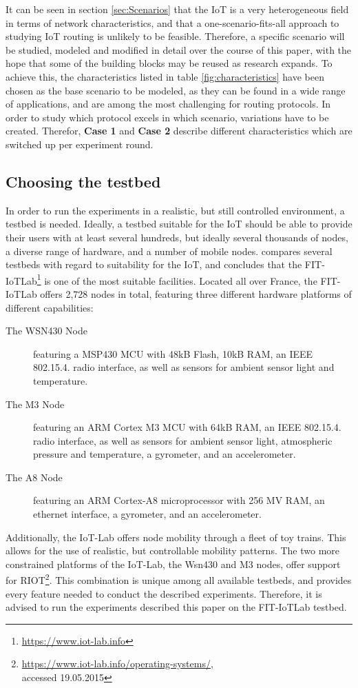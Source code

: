 \documentclass{acm_proc_article-sp}
\begin{document}
It can be seen in section \ref{sec:Scenarios} that the IoT is a very heterogeneous field in terms of network characteristics, and that a one-scenario-fits-all approach to studying IoT routing is unlikely to be feasible. Therefore, a specific scenario will be studied, modeled and modified in detail over the course of this paper, with the hope that some of the building blocks may be reused as research expands. To achieve this, the characteristics listed in table \ref{fig:characteristics} have been chosen as the base scenario to be modeled, as they can be found in a wide range of applications, and are among the most challenging for routing protocols.
In order to study which protocol excels in which scenario, variations have to be created. Therefor, \textbf{Case 1} and \textbf{Case 2} describe different characteristics which are switched up per experiment round.

\subsection{Choosing the testbed}
\label{subsec:testbed_choice}
In order to run the experiments in a realistic, but still controlled environment, a testbed is needed. Ideally, a testbed suitable for the IoT should be able to provide their users with at least several hundreds, but ideally several thousands of nodes, a diverse range of hardware, and a number of mobile nodes. \cite{testbed-survey} compares several testbeds with regard to suitability for the IoT, and concludes that the FIT-IoTLab\footnote{ \url{https://www.iot-lab.info}} is one of the most suitable facilities. Located all over France, the FIT-IoTLab offers 2,728 nodes in total, featuring three different hardware platforms of different capabilities:
\begin{description}
\item[The WSN430 Node] featuring a MSP430 MCU with 48kB Flash, 10kB RAM, an IEEE 802.15.4. radio interface, as well as sensors for ambient sensor light and temperature.
\item[The M3 Node] featuring an ARM Cortex M3 MCU with 64kB RAM, an IEEE 802.15.4. radio interface, as well as sensors for ambient sensor light, atmospheric pressure and temperature, a gyrometer, and an accelerometer.
\item[The A8 Node] featuring an ARM Cortex-A8 microprocessor with 256 MV RAM, an ethernet interface, a gyrometer, and an accelerometer.
\end{description}
Additionally, the IoT-Lab offers node mobility through a fleet of toy trains. This allows for the use of realistic, but controllable mobility patterns.
The two more constrained platforms of the IoT-Lab, the Wsn430 and M3 nodes, offer support for RIOT\cite{riot}\footnote{ \url{https://www.iot-lab.info/operating-systems/}, \\accessed 19.05.2015}.
This combination is unique among all available testbeds, and provides every feature needed to conduct the described experiments. Therefore, it is advised to run the experiments described this paper on the FIT-IoTLab testbed.
\end{document}
